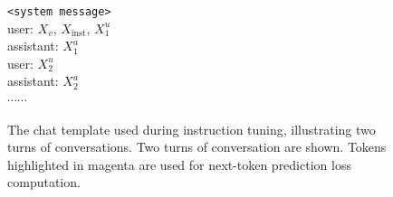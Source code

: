 \begin{figure}[htbp]
\centering
\begin{minipage}{0.99\columnwidth}\vspace{0mm}    \centering
\begin{tcolorbox}[colback=white,colframe=gray,left=1pt,top=1pt,bottom=1pt]
\sffamily
\footnotesize	
  \texttt{<system message>}\\
  user: $X_v$, $X_\text{inst}$, $X_1^u$ \\
  assistant: {\color{magenta}$X_1^a$}\\
user: $X_2^u$\\
  assistant: {\color{magenta}$X_2^a$}\\
  $\cdots\cdots$
\end{tcolorbox}
\end{minipage}
\caption{The chat template used during instruction tuning, illustrating two turns of conversations. Two turns of conversation are shown. Tokens highlighted in {\color{magenta}magenta} are used for next-token prediction loss computation.}
\label{fig:chat}
\end{figure}

